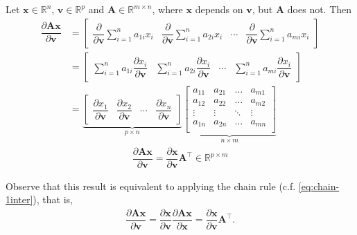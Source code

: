 \documentclass{article}
\newcommand{\trans}{\top}
\begin{document}
Let \(\mathbf{x} \in \mathbb{R}^{n}\), \(\mathbf{v} \in \mathbb{R}^{p}\) and \(\mathbf{A} \in \mathbb{R}^{m\times n}\), where \(\mathbf{x}\) depends on \(\mathbf{v}\), but \(\mathbf{A}\) does not. Then
\begin{align}
    \dfrac{\partial \mathbf{A}  \mathbf{x}}{\partial \mathbf{v}} & =
    \begin{bmatrix}
        \dfrac{\partial}{\partial \mathbf{v}}\sum_{i=1}^{n} a_{1i}x_i & \dfrac{\partial}{\partial \mathbf{v}}\sum_{i=1}^{n} a_{2i}x_i & \cdots & \dfrac{\partial}{\partial \mathbf{v}}\sum_{i=1}^{n} a_{mi}x_i
    \end{bmatrix} \\
    & = \begin{bmatrix}
        \sum_{i=1}^{n} a_{1i}\dfrac{\partial x_i}{\partial \mathbf{v}} & \sum_{i=1}^{n} a_{2i}\dfrac{\partial x_i}{\partial \mathbf{v}} & \cdots & \sum_{i=1}^{n} a_{mi}\dfrac{\partial x_i}{\partial \mathbf{v}}
    \end{bmatrix} \\
    & = \underbrace{\begin{bmatrix}
        \dfrac{\partial x_1}{\partial \mathbf{v}} & \dfrac{\partial x_2}{\partial \mathbf{v}} & \cdots & \dfrac{\partial x_n}{\partial \mathbf{v}}
    \end{bmatrix}}_{p \times n}
    \underbrace{\begin{bmatrix}
        a_{11} & a_{21} & \dots & a_{m1} \\
        a_{12} & a_{22} & \dots & a_{m2} \\
        \vdots & \vdots & \ddots & \vdots \\
        a_{1n} & a_{2n} & \dots & a_{mn} \\
    \end{bmatrix}}_{n \times m}
\end{align}
\begin{align}
    \boxed{\dfrac{\partial \mathbf{A}  \mathbf{x}}{\partial \mathbf{v}} = \dfrac{\partial \mathbf{x}}{\partial \mathbf{v}} \mathbf{A}^\trans \in \mathbb{R}^{p \times m}}
\end{align}

Observe that this result is equivalent to applying the chain rule (c.f. \eqref{eq:chain-1inter}), that is,
\begin{align}
    \dfrac{\partial \mathbf{A}  \mathbf{x}}{\partial \mathbf{v}} = \dfrac{\partial \mathbf{x}}{\partial \mathbf{v}} \dfrac{\partial \mathbf{A}  \mathbf{x}}{\partial \mathbf{x}} = \dfrac{\partial \mathbf{x}}{\partial \mathbf{v}} \mathbf{A}^\trans.
\end{align}
\end{document}
